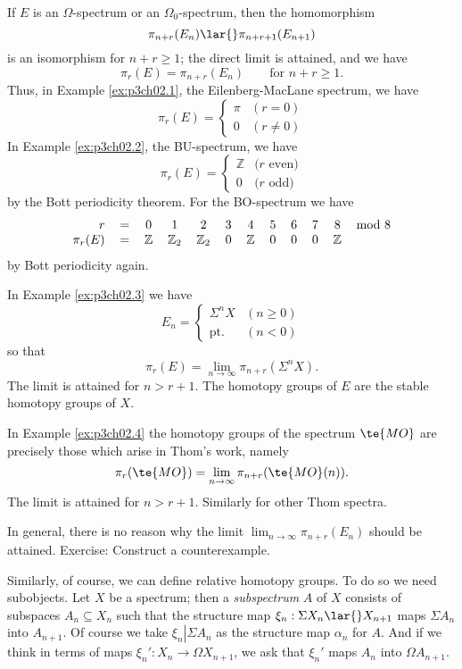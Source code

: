 \documentclass[../main]{subfiles}
\begin{document}
If $E$ is an $\Omega$-spectrum or an $\Omega_0$-spectrum, then the homomorphism
\[
\pi_{n+r}(E_n)
\lar{}
\pi_{n+r+1}(E_{n+1})
\]
is an isomorphism for $n+r\geq 1$; the direct limit is attained, and we have
\[
\pi_r(E)=\pi_{n+r}(E_n)
\qquad
\text{for $n+r\geq 1$.}
\]
Thus, in Example \ref{ex:p3ch02.1}, the Eilenberg-MacLane spectrum, we have
\[
\pi_r(E)
=
\begin{cases}
\pi &(r=0) \\
  0 &(r\neq 0)
\end{cases}
\]
In Example \ref{ex:p3ch02.2}, the BU-spectrum, we have
\[
\pi_r(E)
=
\begin{cases}
\mathbb Z &\text{($r$ even)} \\
  0 &\text{($r$ odd)}
\end{cases}
\]
by the Bott periodicity theorem. For the BO-spectrum we have
\[
\begin{tabular}{rccccccccccc}
$r$ & = & 
0&1&2&3&4&5&6&7&8&mod 8 \\
$\pi_r(E)$ & = &
$\mathbb Z$ & $\mathbb Z_2$ & $\mathbb Z_2$ & 0 & $\mathbb Z$ & 0 & 0 & 0 & $\mathbb Z$ &
\end{tabular}
\]
by Bott periodicity again.

In Example \ref{ex:p3ch02.3} we have
\[
E_n
=
\begin{cases}
\Sigma  ^nX         &(n\geq 0) \\
\mathrm{pt.} &(n<0)
\end{cases}
\]
so that
\[
\pi_r(E) = \lim_{n\to \infty} \pi_{n+r}(\Sigma  ^nX).
\]
The limit is attained for $n>r+1$. The homotopy groups of $E$ are the stable homotopy groups of $X$.

In Example \ref{ex:p3ch02.4} the homotopy groups of the spectrum $\te{MO}$ are precisely those which arise in Thom's work, namely
\[
\pi_r(\te{MO}) = \lim_{n\to \infty} \pi_{n+r}(\te{MO}(n)).
\]
The limit is attained for $n>r+1$. Similarly for other Thom spectra.

In general, there is no reason why the limit $\displaystyle \lim_{n\to \infty} \pi_{n+r}(E_n)$ should be attained. Exercise: Construct a counterexample.

Similarly, of course, we can define relative homotopy groups. To do so we need subobjects. Let $X$ be a spectrum; then a \emph{subspectrum} $A$ of $X$ consists of subspaces $A_n\subseteq X_n$ such that the structure map $\xi_n: \Sigma   X_n \lar{} X_{n+1}$ maps $\Sigma   A_n$ into $A_{n+1}$. Of course we take $\left. \xi_n \right\rvert \Sigma   A_n$ as the structure map $\alpha_n$ for $A$. And if we think in terms of maps $\xi_n': X_n\to\Omega X_{n+1}$, we ask that $\xi_n'$ maps $A_n$ into $\Omega A_{n+1}$.
\end{document}
